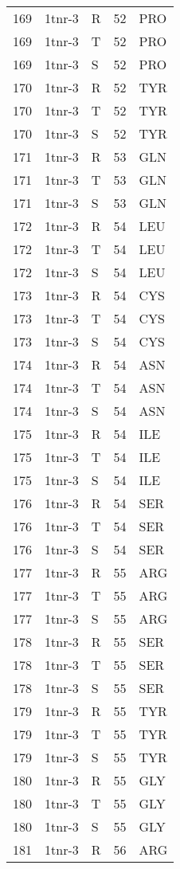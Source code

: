 \begin{tiny}
\begin{longtable}[l]{l|l|l|l|l}
	169 & 1tnr-3 & R & 52 & PRO \\
	169 & 1tnr-3 & T & 52 & PRO \\
	169 & 1tnr-3 & S & 52 & PRO \\
	170 & 1tnr-3 & R & 52 & TYR \\
	170 & 1tnr-3 & T & 52 & TYR \\
	170 & 1tnr-3 & S & 52 & TYR \\
	171 & 1tnr-3 & R & 53 & GLN \\
	171 & 1tnr-3 & T & 53 & GLN \\
	171 & 1tnr-3 & S & 53 & GLN \\
	172 & 1tnr-3 & R & 54 & LEU \\
	172 & 1tnr-3 & T & 54 & LEU \\
	172 & 1tnr-3 & S & 54 & LEU \\
	173 & 1tnr-3 & R & 54 & CYS \\
	173 & 1tnr-3 & T & 54 & CYS \\
	173 & 1tnr-3 & S & 54 & CYS \\
	174 & 1tnr-3 & R & 54 & ASN \\
	174 & 1tnr-3 & T & 54 & ASN \\
	174 & 1tnr-3 & S & 54 & ASN \\
	175 & 1tnr-3 & R & 54 & ILE \\
	175 & 1tnr-3 & T & 54 & ILE \\
	175 & 1tnr-3 & S & 54 & ILE \\
	176 & 1tnr-3 & R & 54 & SER \\
	176 & 1tnr-3 & T & 54 & SER \\
	176 & 1tnr-3 & S & 54 & SER \\
	177 & 1tnr-3 & R & 55 & ARG \\
	177 & 1tnr-3 & T & 55 & ARG \\
	177 & 1tnr-3 & S & 55 & ARG \\
	178 & 1tnr-3 & R & 55 & SER \\
	178 & 1tnr-3 & T & 55 & SER \\
	178 & 1tnr-3 & S & 55 & SER \\
	179 & 1tnr-3 & R & 55 & TYR \\
	179 & 1tnr-3 & T & 55 & TYR \\
	179 & 1tnr-3 & S & 55 & TYR \\
	180 & 1tnr-3 & R & 55 & GLY \\
	180 & 1tnr-3 & T & 55 & GLY \\
	180 & 1tnr-3 & S & 55 & GLY \\
	181 & 1tnr-3 & R & 56 & ARG \\

\end{longtable}
\end{tiny}
